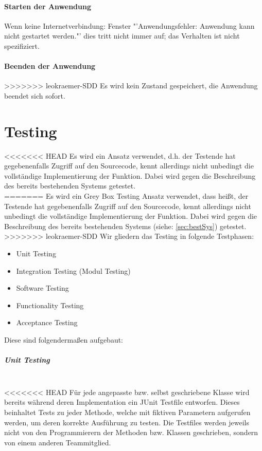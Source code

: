 \documentclass[10pt,a4paper]{article}
\newcommand{\G}[1]{\glqq\text{#1}\grqq} %
\begin{document}
\begin{itemize}
\paragraph{Starten der Anwendung}
Wenn keine Internetverbindung: Fenster "'Anwendungsfehler: Anwendung kann nicht gestartet werden."' dies tritt nicht immer auf; das Verhalten ist nicht spezifiziert.
\paragraph{Beenden der Anwendung}
>>>>>>> leokraemer-SDD
Es wird kein Zustand gespeichert, die Anwendung beendet sich sofort.
\section{Testing}
<<<<<<< HEAD
Es wird ein \G{Grey Box testing} Ansatz verwendet, d.h. der Testende hat gegebenenfalls Zugriff auf den Sourcecode, kennt allerdings nicht unbedingt die vollständige Implementierung der Funktion. Dabei wird gegen die Beschreibung des bereits bestehenden Systems getestet.\\
=======
Es wird ein Grey Box Testing Ansatz verwendet, dass heißt, der Testende hat gegebenenfalls Zugriff auf den Sourcecode, kennt allerdings nicht unbedingt die vollständige Implementierung der Funktion. Dabei wird gegen die Beschreibung des bereits bestehenden Systems (siehe: \autoref{sec:bestSys}) getestet.\\
>>>>>>> leokraemer-SDD
Wir gliedern das Testing in folgende Testphasen:
{\small\begin{itemize}
\item Unit Testing
\item Integration Testing (Modul Testing)
\item Software Testing
\item Functionality Testing
\item Acceptance Testing\\
\end{itemize}}
Diese sind folgendermaßen aufgebaut:
\subparagraph{Unit Testing}\ \\
<<<<<<< HEAD
Für jede angepasste bzw. selbst geschriebene Klasse wird bereits während deren Implementation ein JUnit Testfile entworfen. Dieses beinhaltet Tests zu jeder Methode, welche mit fiktiven Parametern aufgerufen werden, um deren korrekte Ausführung zu testen. Die Testfiles werden jeweils nicht von den Programmierern der Methoden bzw. Klassen geschrieben, sondern von einem anderen Teammitglied. 


\end{itemize}
\end{document}
